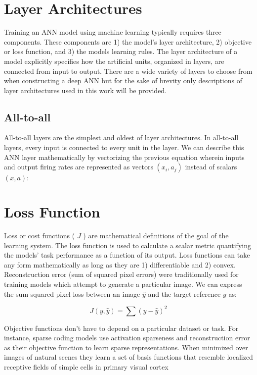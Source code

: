 \documentclass{templates/ucdenverthesis}
\begin{document}
\hypertarget{sec:architectures}{%
\section{Layer Architectures}\label{sec:architectures}}

Training an ANN model using machine learning typically requires three components. These components are 1) the model's layer architecture, 2) objective or loss function, and 3) the models learning rules. The layer architecture of a model explicitly specifies how the artificial units, organized in layers, are connected from input to output. There are a wide variety of layers to choose from when constructing a deep ANN but for the sake of brevity only descriptions of layer architectures used in this work will be provided.

\hypertarget{sec:all2all}{%
\subsection{All-to-all}\label{sec:all2all}}

All-to-all layers are the simplest and oldest of layer architectures. In all-to-all layers, every input is connected to every unit in the layer. We can describe this ANN layer mathematically by vectorizing the previous equation wherein inputs and output firing rates are represented as vectors \((x_i,a_j)\) instead of scalars \((x,a)\):

\hypertarget{sec:lossfunc}{%
\section{Loss Function}\label{sec:lossfunc}}

Loss or cost functions ( \(J\) ) are mathematical definitions of the goal of the learning system. The loss function is used to calculate a scalar metric quantifying the models' task performance as a function of its output. Loss functions can take any form mathematically as long as they are 1) differentiable and 2) convex. Reconstruction error (sum of squared pixel errors) were traditionally used for training models which attempt to generate a particular image. We can express the sum squared pixel loss between an image \(\hat{y}\) and the target reference \(y\) as:

\[
J(y,\hat{y}) = \sum (y-\hat{y})^2
\]

Objective functions don't have to depend on a particular dataset or task. For instance, sparse coding models use activation sparseness and reconstruction error as their objective function to learn sparse representations. When minimized over images of natural scenes they learn a set of basis functions that resemble localized receptive fields of simple cells in primary visual cortex \autocite{Olshausen:1996kc}
\end{document}

